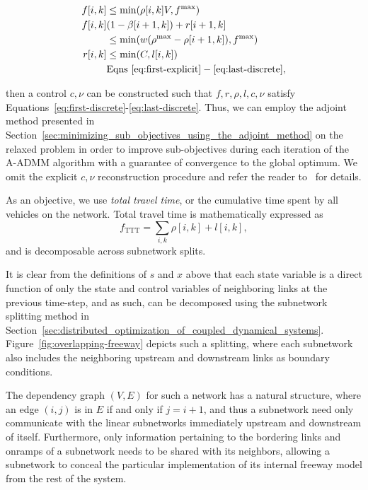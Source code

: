 \begin{align}
f\left[i,k\right] & \le \min\left(\rho\left[i,k\right] V, f^{\max} \right) \label{eq:relax1}\\
f\left[i, k\right] & (1 - \beta\left[i+1,k\right]) + r\left[i+1,k\right] \\
 & \le \min\left(w\left(\rho^{\max} - \rho\left[i+1,k\right]\right), f^{\max}\right) \nonumber \\
r\left[i,k\right] &  \le \min\left(C, l\left[i,k\right]\right) \label{eq:relax2} \\
& \text{Eqns}~\eqref{eq:first-explicit}-\eqref{eq:last-discrete}, \nonumber
\end{align}

then a control $c,\nu$ can be constructed such that $f,r,\rho, l, c, \nu$ satisfy Equations~\eqref{eq:first-discrete}-\eqref{eq:last-discrete}. Thus, we can employ the adjoint method presented in Section~\ref{sec:minimizing_sub_objectives_using_the_adjoint_method} on the relaxed problem in order to improve sub-objectives during each iteration of the A-ADMM algorithm with a guarantee of convergence to the global optimum. We omit the explicit $c,\nu$ reconstruction procedure and refer the reader to~\cite{Muralidharana} for details.

As an objective, we use \emph{total travel time}, or the cumulative time spent by all vehicles on the network. Total travel time is mathematically expressed as
\[
f_{\text{TTT}} = \sum_{i,k} \rho\left[i,k\right] + l\left[i,k\right],
\] and is decomposable across subnetwork splits.

It is clear from the definitions of $s$ and $x$ above that each state variable is a direct function of only the state and control variables of neighboring links at the previous time-step, and as such, can be decomposed using the subnetwork splitting method in Section~\ref{sec:distributed_optimization_of_coupled_dynamical_systems}. Figure~\ref{fig:overlapping-freeway} depicts such a splitting, where each subnetwork also includes the neighboring upstream and downstream links as boundary conditions.

The dependency graph $\left(V,E\right)$ for such a network has a natural structure, where an edge $(i,j)$ is in $E$ if and only if $j=i+1$, and thus a subnetwork need only communicate with the linear subnetworks immediately upstream and downstream of itself. Furthermore, only information pertaining to the bordering links and onramps of a subnetwork needs to be shared with its neighbors, allowing a subnetwork to conceal the particular implementation of its internal freeway model from the rest of the system.


